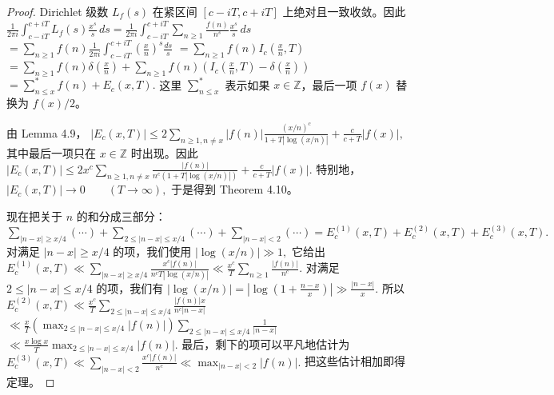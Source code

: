 \begin{proof}
	Dirichlet 级数 $L_f(s)$ 在紧区间 $[c-iT,c+iT]$ 上绝对且一致收敛。因此
	\(\textstyle \frac1{2\pi i}\int_{c-iT}^{c+\allowbreak{}iT} L_f(s)\frac{x^s}{s}\,ds =\allowbreak{} \frac1{2\pi i}\int_{c-iT}^{c+\allowbreak{}iT} \sum_{n\geq\allowbreak{} 1}\frac{f(n)}{n^s}\frac{x^s}{s}\,ds\) \(\textstyle =\allowbreak{} \sum_{n\geq\allowbreak{} 1}f(n) \frac1{2\pi i}\int_{c-iT}^{c+\allowbreak{}iT} \left(\frac{x}{n}\right)^s\frac{ds}{s}\) \(\textstyle =\allowbreak{} \sum_{n\geq\allowbreak{} 1}f(n)I_c\left(\frac{x}{n},\allowbreak{}T\right)\) \(\textstyle =\allowbreak{} \sum_{n\geq\allowbreak{} 1}f(n)\delta\left(\frac{x}{n}\right) +\allowbreak{} \sum_{n\geq\allowbreak{} 1}f(n) \left(I_c\left(\frac{x}{n},\allowbreak{}T\right) - \delta\left(\frac{x}{n}\right)\right)\) \(\textstyle =\allowbreak{} \sum_{n\leq\allowbreak{} x}^{*}f(n)+\allowbreak{}E_c(x,\allowbreak{}T).\)
	这里 $\sum_{n\leq x}^{*}$ 表示如果 $x\in\mathbb Z$，最后一项 $f(x)$ 替换为 $f(x)/2$。

	由 Lemma 4.9，
	\(\textstyle |E_c(x,\allowbreak{}T)| \leq\allowbreak{} 2\sum_{n\geq\allowbreak{} 1,\allowbreak{} n\neq\allowbreak{} x} |f(n)|\frac{(x/n)^c}{1+\allowbreak{}T|\log(x/n)|} +\allowbreak{} \frac{c}{c+\allowbreak{}T}|f(x)|,\allowbreak{}\)
	其中最后一项只在 $x\in\mathbb Z$ 时出现。因此
	\(\textstyle |E_c(x,\allowbreak{}T)| \leq\allowbreak{} 2x^c\sum_{n\geq\allowbreak{} 1,\allowbreak{} n\neq\allowbreak{} x} \frac{|f(n)|}{n^c(1+\allowbreak{}T|\log(x/n)|)} +\allowbreak{} \frac{c}{c+\allowbreak{}T}|f(x)|.\)
	特别地，
	\(\textstyle |E_c(x,\allowbreak{}T)|\to\allowbreak{} 0 \qquad (T\to\allowbreak{}\infty),\allowbreak{}\)
	于是得到 Theorem 4.10。

	现在把关于 $n$ 的和分成三部分：
	\(\textstyle \sum_{|n-x|\geq\allowbreak{} x/4}(\cdots) +\allowbreak{} \sum_{2\leq\allowbreak{} |n-x|\leq\allowbreak{} x/4}(\cdots) +\allowbreak{} \sum_{|n-x|<2}(\cdots) =\allowbreak{} E_c^{(1)}(x,\allowbreak{}T)+\allowbreak{}E_c^{(2)}(x,\allowbreak{}T)+\allowbreak{}E_c^{(3)}(x,\allowbreak{}T).\)
	对满足 $|n-x|\geq x/4$ 的项，我们使用
	\(\textstyle |\log(x/n)|\gg\allowbreak{} 1,\allowbreak{}\)
	它给出
	\(\textstyle E_c^{(1)}(x,\allowbreak{}T) \ll\allowbreak{} \sum_{|n-x|\geq\allowbreak{} x/4} \frac{x^c|f(n)|}{n^cT|\log(x/n)|} \ll\allowbreak{} \frac{x^c}{T}\sum_{n\geq\allowbreak{} 1}\frac{|f(n)|}{n^c}.\)
	对满足 $2\leq |n-x|\leq x/4$ 的项，我们有
	\(\textstyle |\log(x/n)| =\allowbreak{} \left|\log\left(1+\allowbreak{}\frac{n-x}{x}\right)\right| \gg\allowbreak{} \frac{|n-x|}{x}.\)
	所以
	\(\textstyle E_c^{(2)}(x,\allowbreak{}T) \ll\allowbreak{} \frac{x^c}{T} \sum_{2\leq\allowbreak{} |n-x|\leq\allowbreak{} x/4} \frac{|f(n)|x}{n^c|n-x|}\) \(\textstyle \ll\allowbreak{} \frac{x}{T} \left(\max_{2\leq\allowbreak{} |n-x|\leq\allowbreak{} x/4}|f(n)|\right) \sum_{2\leq\allowbreak{} |n-x|\leq\allowbreak{} x/4}\frac1{|n-x|}\) \(\textstyle \ll\allowbreak{} \frac{x\log x}{T} \max_{2\leq\allowbreak{} |n-x|\leq\allowbreak{} x/4}|f(n)|.\)
	最后，剩下的项可以平凡地估计为
	\(\textstyle E_c^{(3)}(x,\allowbreak{}T) \ll\allowbreak{} \sum_{|n-x|<2}\frac{x^c|f(n)|}{n^c} \ll\allowbreak{} \max_{|n-x|<2}|f(n)|.\)
	把这些估计相加即得定理。
\end{proof}

